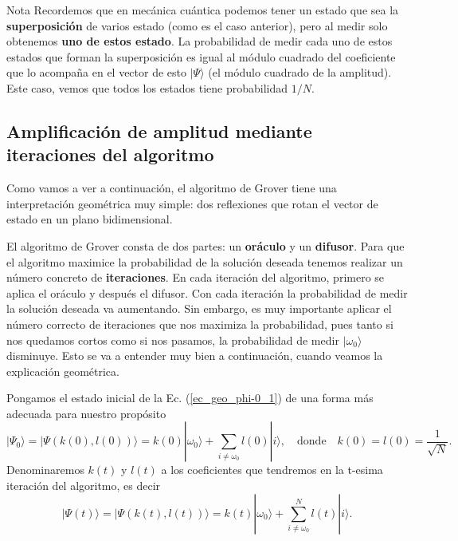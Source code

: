 \documentclass[a4paper,11pt]{article} %
\numberwithin{equation}{section}
\begin{document}
	\begin{mybox}{Nota}
	Recordemos que en mecánica cuántica podemos tener un estado que sea la \textbf{superposición} 
	de varios estado (como es el caso anterior), pero al medir solo obtenemos \textbf{uno de estos 
	estado}. La probabilidad de medir cada uno de estos estados que forman la superposición es igual 
	al módulo cuadrado del coeficiente que lo acompaña en el vector de esto $| \Psi \rangle$ (el módulo 
	cuadrado de la amplitud). Este caso, vemos que todos los estados tiene probabilidad $1/N$. 
	\end{mybox}

\subsection{Amplificación de amplitud mediante iteraciones del algoritmo}

Como vamos a ver a continuación, el algoritmo de Grover tiene una interpretación geométrica muy simple: dos reflexiones que rotan el vector de estado en un plano bidimensional. 

El algoritmo de Grover consta de dos partes: un \textbf{oráculo} y un \textbf{difusor}. Para que el algoritmo maximice la probabilidad de la solución deseada tenemos realizar un número concreto de \textbf{iteraciones}. En cada iteración del algoritmo, primero se aplica el oráculo y después el difusor. Con cada iteración la probabilidad de medir la solución deseada va aumentando. Sin embargo, es muy importante aplicar el número correcto de iteraciones que nos maximiza la probabilidad, pues tanto si nos quedamos cortos como si nos pasamos, la probabilidad de medir $|\omega_0 \rangle$ disminuye. Esto se va a entender muy bien a continuación, cuando veamos la explicación geométrica. 

Pongamos el estado inicial de la Ec. (\ref{ec_geo_phi-0_1}) de una forma más adecuada para nuestro propósito
\begin{equation} \label{ec_geo_phi-0_2}
\boxed{|\Psi_0 \rangle = | \Psi (k(0),l(0)) \rangle = k(0) |\omega_0 \rangle + \sum_{i \neq \omega_0}  l(0)  |i \rangle}, \quad \text{donde} \quad \boxed{k(0) = l(0) = \frac{1}{\sqrt{N}}}.
\end{equation}
Denominaremos $k(t)$ y $l(t)$ a los coeficientes que tendremos en la t-esima iteración del algoritmo, es decir
\begin{equation} \label{ec_geo_phi-j}
\boxed{|\Psi(t) \rangle = | \Psi (k(t),l(t)) \rangle = k(t) |\omega_0 \rangle +  \sum_{i \neq \omega_0}^N l(t) |i \rangle }.
\end{equation}
\end{document}
